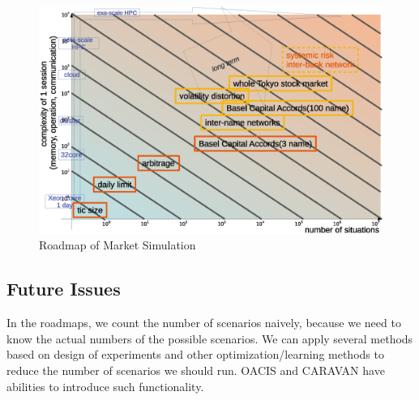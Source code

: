\begin{figure}
  \centering
  \includegraphics[width=.98\linewidth]{Figs.noda/figure2-6.eps}
  \caption{Roadmap of Market Simulation}
  \label{fig:Figure-6}
\end{figure}




\subsection{Future Issues}

In the roadmaps, we count the number of scenarios naively,
because we need to know the actual numbers of the possible scenarios.
We can apply several methods based on design of experiments
and other optimization/learning methods to reduce the number of scenarios
we should run.
OACIS and CARAVAN have abilities to introduce such functionality. 

